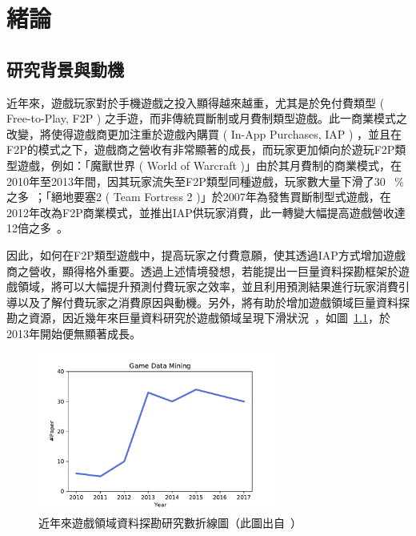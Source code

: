 \chapter{緒論}

\section{研究背景與動機}

近年來，遊戲玩家對於手機遊戲之投入顯得越來越重，尤其是於免付費類型 ( Free-to-Play, F2P ) 之手遊，而非傳統買斷制或月費制類型遊戲。此一商業模式之改變，將使得遊戲商更加注重於遊戲內購買 ( In-App Purchases, IAP ) ，並且在F2P的模式之下，遊戲商之營收有非常顯著的成長，而玩家更加傾向於遊玩F2P類型遊戲，例如：「魔獸世界 ( World of Warcraft )」由於其月費制的商業模式，在2010年至2013年間，因其玩家流失至F2P類型同種遊戲，玩家數大量下滑了30~ \%之多~\cite{drachen2013game}；「絕地要塞2 ( Team Fortress 2 )」於2007年為發售買斷制型式遊戲，在2012年改為F2P商業模式，並推出IAP供玩家消費，此一轉變大幅提高遊戲營收達12倍之多~\cite{miller2012gdc}。

因此，如何在F2P類型遊戲中，提高玩家之付費意願，使其透過IAP方式增加遊戲商之營收，顯得格外重要。透過上述情境發想，若能提出一巨量資料探勘框架於遊戲領域，將可以大幅提升預測付費玩家之效率，並且利用預測結果進行玩家消費引導以及了解付費玩家之消費原因與動機。另外，將有助於增加遊戲領域巨量資料探勘之資源，因近幾年來巨量資料研究於遊戲領域呈現下滑狀況~\cite{lee2018game}，如圖~\ref{fig:GameDataMiningResearchPaper}，於2013年開始便無顯著成長。

\begin{figure}[!htb]
    \begin{center}
      \includegraphics[width=0.7\textwidth]{figures/Image_GameDataMiningResearchPaper.pdf}
      \caption[近年來遊戲領域資料探勘研究數折線圖]{近年來遊戲領域資料探勘研究數折線圖（此圖出自~\cite{lee2018game}）}
      \label{fig:GameDataMiningResearchPaper}
    \end{center}
\end{figure}
\newpage

